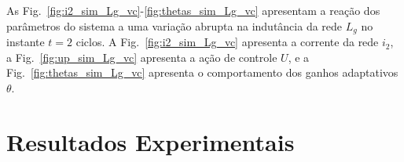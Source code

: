   \newpage

  As Fig.~\ref{fig:i2_sim_Lg_vc}-\ref{fig:thetas_sim_Lg_vc} apresentam a reação dos parâmetros do sistema a uma variação abrupta na indutância da rede $L_g$ no instante $t=2$ ciclos. A Fig.~\ref{fig:i2_sim_Lg_vc} apresenta a corrente da rede $i_2$, a Fig.~\ref{fig:up_sim_Lg_vc} apresenta a ação de controle $U$, e a Fig.~\ref{fig:thetas_sim_Lg_vc} apresenta o comportamento dos ganhos adaptativos $\theta$.

  \vfill
  \noindent
  \begin{minipage}{\textwidth}
    \makebox[\textwidth]{
      \centering
      \def\svgwidth{\textwidth}
      }
    \label{fig:i2_sim_Lg_vc}
  \end{minipage}
  \vfill

  \newpage

  \vfill
  \noindent
  \begin{minipage}{0.9\textwidth}
    \makebox[\textwidth]{
      \centering
      \def\svgwidth{\textwidth}
      }
    \label{fig:up_sim_Lg_vc}
  \end{minipage}

  \vfill
  \noindent
  \begin{minipage}{0.9\textwidth}
    \makebox[\textwidth]{
      \centering
      \def\svgwidth{\textwidth}
      }
    \label{fig:thetas_sim_Lg_vc}
  \end{minipage}

  \vfill

  \newpage


\section{Resultados Experimentais}

